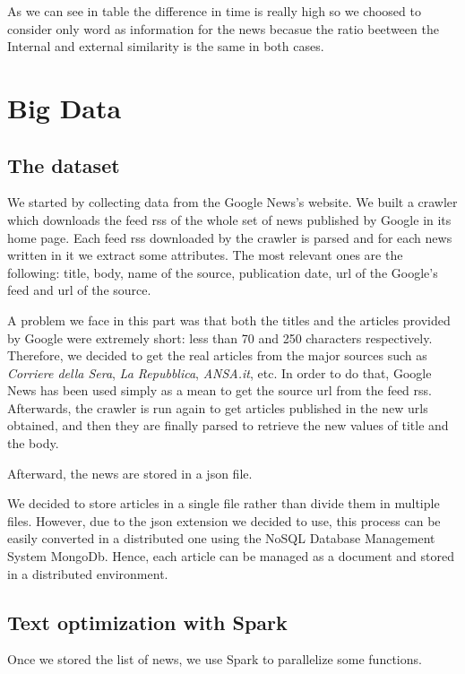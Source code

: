 \documentclass{acm_proc_article-sp}
\begin{document}
As we can see in table  the difference in time is really high so we choosed to consider only word as information for the news becasue the ratio beetween the Internal and external similarity is the same in both cases.

\section{Big Data}
\vspace{2mm}

\subsection{The dataset}
\vspace{2mm}
We started by collecting data from the Google News's website. We built a crawler which downloads the feed rss of the whole set of news published by Google in its home page.
Each feed rss downloaded by the crawler is parsed and for each news written in it we extract some attributes. The most relevant ones are the following: title, body, name of the source, publication date, url of the Google's feed and url of the source.

A problem we face in this part was that both the titles and the articles provided by Google were extremely short: less than 70 and 250 characters respectively. Therefore, we decided to get the real articles from the major sources such as \textit{Corriere della Sera}, \textit{La Repubblica}, \textit{ANSA.it}, etc. In order to do that, Google News has been used simply as a mean to get the source url from the feed rss. Afterwards, the crawler is run again to get articles published in the new urls obtained, and then they are finally parsed to retrieve the new values of title and the body.



Afterward, the news are stored in a json file.

We decided to store articles in a single file rather than divide them in multiple files. However, due to the json extension we decided to use, this process can be easily converted in a distributed one using the NoSQL Database Management System MongoDb. Hence, each article can be managed as a document and stored in a distributed environment.

\subsection{Text optimization with Spark}
\vspace{2mm}
Once we stored the list of news, we use Spark to parallelize some functions.
\end{document}
